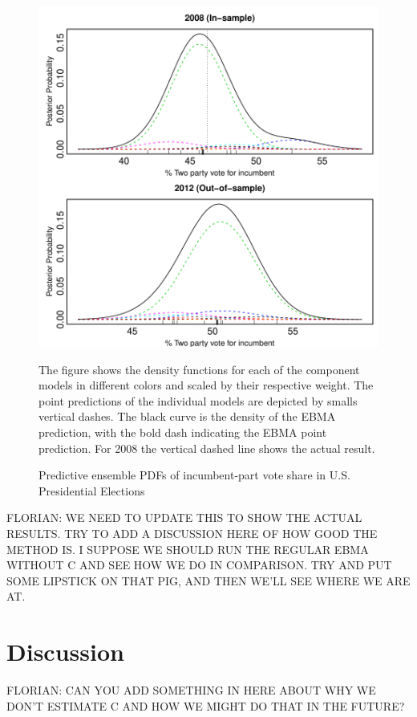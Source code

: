\documentclass[12pt,fullpage,endnotes]{article}
\begin{document}
\begin{figure}[h]
\caption{Predictive ensemble PDFs of incumbent-part vote share in U.S. Presidential Elections}
\label{pres}
\begin{center}
\includegraphics[scale=.8]{presForecast}
\end{center}
The figure shows the density functions for each of the component
models in different colors and scaled by their respective weight. The
point predictions of the individual models are depicted by smalls
vertical dashes. The black curve is the density of the EBMA
prediction, with the bold dash indicating the EBMA point
prediction. For 2008 the vertical dashed line shows the actual result.
\end{figure}


FLORIAN: WE NEED TO UPDATE THIS TO SHOW THE ACTUAL RESULTS.  TRY TO
ADD A DISCUSSION HERE OF HOW GOOD THE METHOD IS.  I SUPPOSE WE SHOULD
RUN THE REGULAR EBMA WITHOUT C AND SEE HOW WE DO IN COMPARISON.  TRY
AND PUT SOME LIPSTICK ON THAT PIG, AND THEN WE'LL SEE WHERE WE ARE AT.



\section{Discussion} 

FLORIAN: CAN YOU ADD SOMETHING IN HERE ABOUT WHY WE DON'T ESTIMATE C AND HOW WE MIGHT DO THAT IN THE FUTURE?
\end{document}
